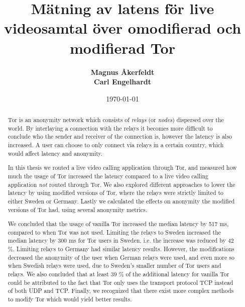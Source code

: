 \documentclass{kththesis}
\title{Mätning av latens för live videosamtal över omodifierad och modifierad Tor}
\author{
  \textbf{Magnus Åkerfeldt}\\
  \textbf{Carl Engelhardt}
}
\date{\today}
\begin{document}
\frontmatter
\titlepage
\begin{abstract}
    Tor is an anonymity network which consists of \emph{relays} (or \emph{nodes}) dispersed over the world. By interlaying a connection with the relays it becomes more difficult to conclude who the sender and receiver of the connection is, however the latency is also increased. A user can choose to only connect via relays in a certain country, which would affect latency and anonymity.
    
    In this thesis we routed a live video calling application through Tor, and measured how much the usage of Tor increased the latency compared to a live video calling application \emph{not} routed through Tor. We also explored different approaches to lower the latency by using modified versions of Tor, where the relays were strictly limited to either Sweden or Germany. Lastly we calculated the effects on anonymity the modified versions of Tor had, using several anonymity metrics.
    
    We concluded that the usage of vanilla Tor increased the median latency by 517 ms, compared to when Tor was not used. Limiting the relays to Sweden increased the median latency by 300 ms for Tor users in Sweden, i.e. the increase was reduced by 42 \%. Limiting relays to Germany had similar latency results. However, the modifications decreased the anonymity of the user when German relays were used, and even more so when Swedish relays were used, due to Sweden's smaller number of Tor users and relays. We also concluded that at least 39 \% of the additional latency for vanilla Tor could be attributed to the fact that Tor only uses the transport protocol TCP instead of both UDP and TCP. Finally, we recognized that there exist more complex methods to modify Tor which would yield better results.
\end{abstract}
\end{document}
